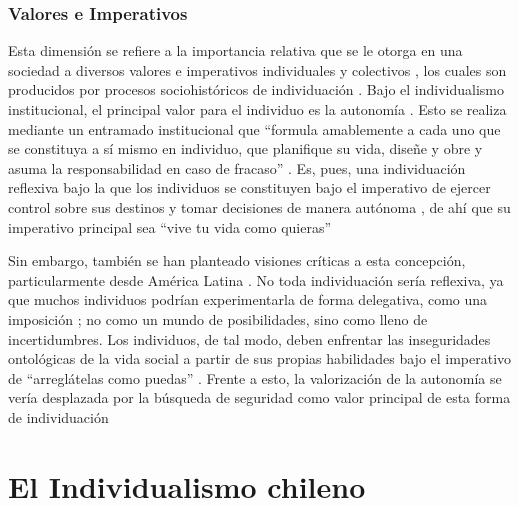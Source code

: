 \documentclass[12pt,twoside]{templates/facsothesis}
\begin{document}
\hypertarget{valores-e-imperativos}{%
\subsubsection{Valores e Imperativos}\label{valores-e-imperativos}}

Esta dimensión se refiere a la importancia relativa que se le otorga en una sociedad a diversos valores e imperativos individuales y colectivos \citep{brewer2007}, los cuales son producidos por procesos sociohistóricos de individuación \citep{martuccelli2018}. Bajo el individualismo institucional, el principal valor para el individuo es la autonomía \citep{martuccelli2010}. Esto se realiza mediante un entramado institucional \citep{martuccelli2018} que ``formula amablemente a cada uno que se constituya a sí mismo en individuo, que planifique su vida, diseñe y obre y asuma la responsabilidad en caso de fracaso'' \citep[p.~59]{robles2001}. Es, pues, una individuación reflexiva bajo la que los individuos se constituyen bajo el imperativo de ejercer control sobre sus destinos y tomar decisiones de manera autónoma \citep{silvapalacios2015}, de ahí que su imperativo principal sea ``vive tu vida como quieras'' \citep{robles2001}

Sin embargo, también se han planteado visiones críticas a esta concepción, particularmente desde América Latina \citep{araujo2012, robles2001}. No toda individuación sería reflexiva, ya que muchos individuos podrían experimentarla de forma delegativa, como una imposición \citep{silvapalacios2015}; no como un mundo de posibilidades, sino como lleno de incertidumbres. Los individuos, de tal modo, deben enfrentar las inseguridades ontológicas de la vida social a partir de sus propias habilidades bajo el imperativo de ``arreglátelas como puedas'' \citep{araujo2014, robles2001}. Frente a esto, la valorización de la autonomía se vería desplazada por la búsqueda de seguridad como valor principal de esta forma de individuación \citep{silvapalacios2015}

\hypertarget{el-individualismo-chileno}{%
\section{El Individualismo chileno}\label{el-individualismo-chileno}}
\end{document}
